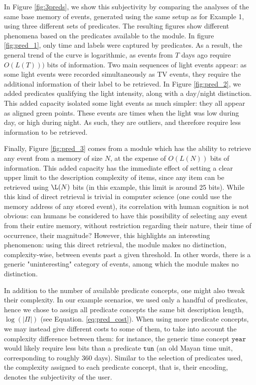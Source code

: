 \documentclass[entropy,article,submit,moreauthors,pdftex]{Definitions/mdpi}
\begin{document}
In Figure \ref{fig:3preds}, we show this subjectivity by comparing the analyses of the same base memory of events, generated using the same setup as for Example 1, using three different sets of predicates. The resulting figures show different phenomena based on the predicates available to the module. In figure \ref{fig:pred_1}, only time and labels were captured by predicates. As a result, the general trend of the curve is logarithmic, as events from $T$ days ago require $O(L(T)))$ bits of information. Two main sequences of light events appear: as some light events were recorded simultaneously as TV events, they require the additional information of their label to be retrieved. In Figure \ref{fig:pred_2}, we added predicates qualifying the light intensity, along with a day/night distinction. This added capacity isolated some light events as much simpler: they all appear as aligned green points. These events are times when the light was low during day, or high during night. As such, they are outliers, and therefore require less information to be retrieved.

Finally, Figure \ref{fig:pred_3} comes from a module which has the ability to retrieve any event from a memory of size $N$, at the expense of $O(L(N))$ bits of information. This added capacity has the immediate effect of setting a clear upper limit to the description complexity of items, since any item can be retrieved using $\L(N)$ bits (in this example, this limit is around 25 bits). While this kind of direct retrieval is trivial in computer science (one could use the memory address of any stored event), its correlation with human cognition is not obvious: can humans be considered to have this possibility of selecting any event from their entire memory, without restriction regarding their nature, their time of occurrence, their magnitude? However, this highlights an interesting phenomenon: using this direct retrieval, the module makes no distinction, complexity-wise, between events past a given threshold. In other words, there is a generic "uninteresting" category of events, among which the module makes no distinction.

In addition to the number of available predicate concepts, one might also tweak their complexity. In our example scenarios, we used only a handful of predicates, hence we chose to assign all predicate concepts the same bit description length, $\log(|\Pi|)$ (see Equation. \ref{eq:pred_cost}). When using more predicate concepts, we may instead give different costs to some of them, to take into account the complexity difference between them: for instance, the generic time concept $\texttt{year}$ would likely require less bits than a predicate $\texttt{tun}$ (an old Mayan time unit, corresponding to roughly 360 days). Similar to the selection of predicates used, the complexity assigned to each predicate concept, that is, their encoding, denotes the subjectivity of the user.
\end{document}
